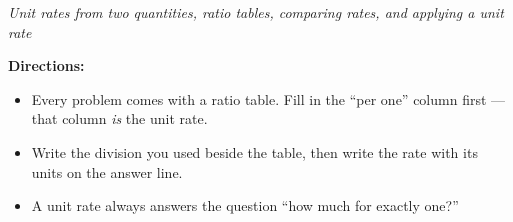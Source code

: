 \documentclass[12pt]{article}
\begin{document}

\noindent\emph{Unit rates from two quantities, ratio tables, comparing rates, and applying a unit rate}

\vspace{0.15cm}
\noindent\textbf{Directions:}
\begin{itemize}[leftmargin=0.9cm, itemsep=2pt, topsep=3pt]
  \item Every problem comes with a ratio table. Fill in the ``per one'' column
        first --- that column \emph{is} the unit rate.
  \item Write the division you used beside the table, then write the rate with
        its units on the answer line.
  \item A unit rate always answers the question ``how much for exactly one?''
\end{itemize}


\end{document}
